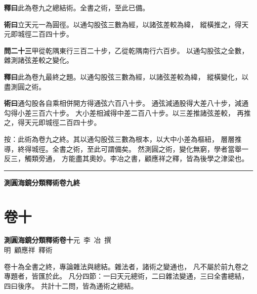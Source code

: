 \documentclass[12pt,a4paper]{article}
\newcommand{\Volume}[1]{\newpage\section*{卷#1}}
\begin{document}
\noindent\textbf{釋曰}\quad 此為卷九之總結術。全書之術，至此已備。

\vspace{0.3em}

\noindent\textbf{術曰}\quad 立天元一為圓徑。以通勾股弦三數為經，以諸弦差較為緯，
縱橫推之，得天元即城徑二百四十步。

\vspace{0.5em}

\noindent\textbf{問二十三}\quad 甲從乾隅東行三百二十步，乙從乾隅南行六百步。
以通勾股弦之全數，雜測諸弦差較之變化。

\vspace{0.3em}

\noindent\textbf{釋曰}\quad 此為卷九最終之題。以通勾股弦三數為經，以諸弦差較為緯，
縱橫變化，以盡測圓之術。

\vspace{0.3em}

\noindent\textbf{術曰}\quad 通勾股各自乘相併開方得通弦六百八十步。
通弦減通股得大差八十步，減通勾得小差三百六十步。
大小差相減得中差二百八十步。以三差推諸弦差較，
再推之，得天元即城徑二百四十步。

\vspace{0.3em}

\noindent
按：此術為卷九之終。其以通勾股弦三數為根本，以大中小差為樞紐，
層層推導，終得城徑。全書之術，至此可謂備矣。
然測圓之術，變化無窮，學者當舉一反三，觸類旁通，
方能盡其奧妙。李冶之書，顧應祥之釋，皆為後學之津梁也。

\vspace{1em}
\begin{center}
\rule{0.5\textwidth}{0.4pt}

\textbf{測圓海鏡分類釋術卷九終}
\end{center}


\Volume{十}

\noindent\textbf{測圓海鏡分類釋術卷十}\quad 元~李~冶~撰\\
明~顧應祥~釋術

\vspace{1em}

\noindent
卷十為全書之終，專論雜法與總結。雜法者，諸術之變通也，
凡不屬於前九卷之專題者，皆匯於此。
凡分四節：一曰天元總術，二曰雜法變通，三曰全書總結，四曰後序。
共計十二問，皆為通術之總結。

\vspace{0.5em}
\end{document}
